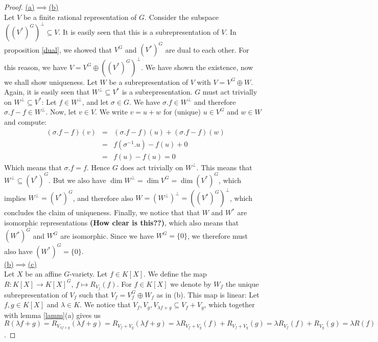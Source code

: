 \begin{proof}
  \hfill \break
  \underline{(a)$\implies$(b)}\\
  Let $V$ be a finite rational representation of $G$.
  Consider the subspace $ ((V^\ast)^G)^\bot \subseteq V $.
  It is easily seen that this is a subrepresentation of $V$.
  In proposition \ref{dual}, we showed that $V^G$ and $(V^\ast)^G$ are dual to each other.
  For this reason, we have $V = V^G \oplus ((V^\ast)^G)^\bot $.
  We have shown the existence, now we shall show uniqueness.
  Let $W$ be a subrepresentation of $V$ with $V = V^G \oplus W $.
  Again, it is easily seen that $W^\bot \subseteq V^\ast$ is a subrepresentation.
  $G$ must act trivially on $W^\bot \subseteq V^\ast$:
  Let $f \in W^\bot$, and let $\sigma \in G$.
  We have $\sigma.f \in W^\bot$ and therefore $\sigma.f - f \in W^\bot$.
  Now, let $v \in V$.
  We write $v = u + w$ for (unique) $u \in V^G$ and $w \in W$ and compute:
  \begin{equation}
    \begin{aligned}
      &(\sigma.f -f)(v)&=&(\sigma.f -f)(u) + (\sigma.f -f)(w)\\
      &&=&f(\sigma^{-1}.u) - f(u) + 0\\
      &&=&f(u)-f(u) = 0
    \end{aligned}
  \end{equation}
  Which means that $\sigma.f = f$.
  Hence $G$ does act trivially on $W^\bot$.
  This means that $W^\bot \subseteq (V^\ast)^G$.
  But we also have $\operatorname{dim}W^\bot = \operatorname{dim}V^G = \operatorname{dim}(V^\ast)^G$, which implies $W^\bot = (V^\ast)^G$, and therefore also $W = (W^\bot)^\bot = ((V^\ast)^G)^\bot$, which concludes the claim of uniqueness.
  Finally, we notice that that $W$ and $W^\ast$ are isomorphic representations \textbf{(How clear is this??)}, which also means that $(W^\ast)^G$ and $W^G$ are isomorphic.
  Since we have $W^G = \{0\}$, we therefore must also have $(W^\ast)^G = \{0\}$.\\
  \underline{(b)$\implies$(c)}\\
  Let $X$ be an affine $G$-variety.
  Let $f \in K[X]$.
  We define the map $R \colon K[X] \longrightarrow K[X]^G $, $ f \mapsto R_{V_f}(f)$.
  For $f \in K[X]$ we denote by $W_f$ the unique subrepresentation of $V_f$ such that $V_f = V_f^G \oplus W_f$ as in (b).
  This map is linear:
  Let $f,g \in K[X]$ and $\lambda \in K$.
  We notice that $V_f,V_g,V_{\lambda f + g} \subseteq V_f + V_g$, which together with lemma \ref{lamm}(a) gives us $R(\lambda f +g) = R_{V_{\lambda f +g}}(\lambda f+g) = R_{V_f +V_g}(\lambda f+g) = \lambda R_{V_f + V_g} (f) + R_{V_f + V_g}(g) = \lambda R_{V_f} (f) + R_{V_g}(g) = \lambda R(f) + R(g)$.

\end{proof}
